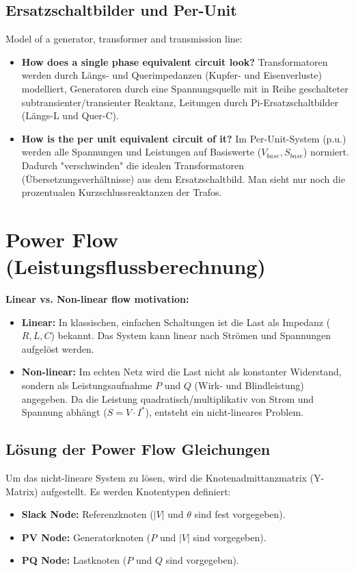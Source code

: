 \documentclass[11pt, a4paper]{article}
\begin{document}
\subsection{Ersatzschaltbilder und Per-Unit}
Model of a generator, transformer and transmission line:
\begin{itemize}
    \item \textbf{How does a single phase equivalent circuit look?} Transformatoren werden durch Längs- und Querimpedanzen (Kupfer- und Eisenverluste) modelliert, Generatoren durch eine Spannungsquelle mit in Reihe geschalteter subtransienter/transienter Reaktanz, Leitungen durch Pi-Ersatzschaltbilder (Längs-L und Quer-C).
    \item \textbf{How is the per unit equivalent circuit of it?} Im Per-Unit-System (p.u.) werden alle Spannungen und Leistungen auf Basiswerte ($V_{base}, S_{base}$) normiert. Dadurch "verschwinden" die idealen Transformatoren (Übersetzungsverhältnisse) aus dem Ersatzschaltbild. Man sieht nur noch die prozentualen Kurzschlussreaktanzen der Trafos.
\end{itemize}

\section{Power Flow (Leistungsflussberechnung)}

\textbf{Linear vs. Non-linear flow motivation:}
\begin{itemize}
    \item \textbf{Linear:} In klassischen, einfachen Schaltungen ist die Last als Impedanz ($R, L, C$) bekannt. Das System kann linear nach Strömen und Spannungen aufgelöst werden.
    \item \textbf{Non-linear:} Im echten Netz wird die Last nicht als konstanter Widerstand, sondern als Leistungsaufnahme $P$ und $Q$ (Wirk- und Blindleistung) angegeben. Da die Leistung quadratisch/multiplikativ von Strom und Spannung abhängt ($S = V \cdot I^*$), entsteht ein nicht-lineares Problem.
\end{itemize}

\subsection{Lösung der Power Flow Gleichungen}
Um das nicht-lineare System zu lösen, wird die Knotenadmittanzmatrix (Y-Matrix) aufgestellt.
Es werden Knotentypen definiert:
\begin{itemize}
    \item \textbf{Slack Node:} Referenzknoten ($|V|$ und $\theta$ sind fest vorgegeben).
    \item \textbf{PV Node:} Generatorknoten ($P$ und $|V|$ sind vorgegeben).
    \item \textbf{PQ Node:} Lastknoten ($P$ und $Q$ sind vorgegeben).
\end{itemize}
\end{document}
